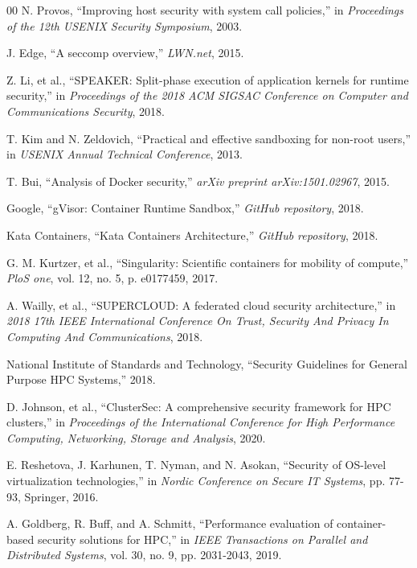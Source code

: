 \documentclass[conference]{IEEEtran}
\begin{document}

\begin{thebibliography}{00}
 N. Provos, ``Improving host security with system call policies,'' in \textit{Proceedings of the 12th USENIX Security Symposium}, 2003.

 J. Edge, ``A seccomp overview,'' \textit{LWN.net}, 2015.

 Z. Li, et al., ``SPEAKER: Split-phase execution of application kernels for runtime security,'' in \textit{Proceedings of the 2018 ACM SIGSAC Conference on Computer and Communications Security}, 2018.

 T. Kim and N. Zeldovich, ``Practical and effective sandboxing for non-root users,'' in \textit{USENIX Annual Technical Conference}, 2013.

 T. Bui, ``Analysis of Docker security,'' \textit{arXiv preprint arXiv:1501.02967}, 2015.

 Google, ``gVisor: Container Runtime Sandbox,'' \textit{GitHub repository}, 2018.

 Kata Containers, ``Kata Containers Architecture,'' \textit{GitHub repository}, 2018.

 G. M. Kurtzer, et al., ``Singularity: Scientific containers for mobility of compute,'' \textit{PloS one}, vol. 12, no. 5, p. e0177459, 2017.

 A. Wailly, et al., ``SUPERCLOUD: A federated cloud security architecture,'' in \textit{2018 17th IEEE International Conference On Trust, Security And Privacy In Computing And Communications}, 2018.

 National Institute of Standards and Technology, ``Security Guidelines for General Purpose HPC Systems,'' 2018.

 D. Johnson, et al., ``ClusterSec: A comprehensive security framework for HPC clusters,'' in \textit{Proceedings of the International Conference for High Performance Computing, Networking, Storage and Analysis}, 2020.

 E. Reshetova, J. Karhunen, T. Nyman, and N. Asokan, ``Security of OS-level virtualization technologies,'' in \textit{Nordic Conference on Secure IT Systems}, pp. 77-93, Springer, 2016.

 A. Goldberg, R. Buff, and A. Schmitt, ``Performance evaluation of container-based security solutions for HPC,'' in \textit{IEEE Transactions on Parallel and Distributed Systems}, vol. 30, no. 9, pp. 2031-2043, 2019.


\end{thebibliography}
\end{document}
